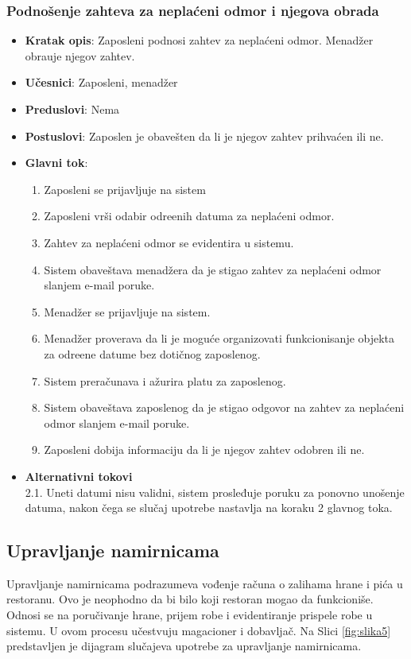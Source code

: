  \subsubsection{Podno\v senje zahteva za nepla\'ceni odmor i njegova obrada }
 \begin{itemize}
    \item \textbf{Kratak opis}:
  Zaposleni podnosi zahtev za nepla\'ceni odmor. Menad\v zer obra\dj uje njegov zahtev.
    \item \textbf{Učesnici}:
    Zaposleni, menad\v zer
    \item \textbf{Preduslovi}: Nema
    \item \textbf{Postuslovi}:
    Zaposlen je obave\v sten da li je njegov zahtev prihva\'cen ili ne.
    \item \textbf{Glavni tok}:
    \begin{enumerate}
        \item Zaposleni se prijavljuje na sistem
        \item Zaposleni vr\v si odabir odre\dj enih datuma za nepla\'ceni odmor.
        \item Zahtev za nepla\'ceni odmor se evidentira u sistemu.
        \item Sistem obave\v stava menad\v zera da je stigao zahtev za nepla\'ceni odmor slanjem e-mail poruke.
        \item Menad\v zer se prijavljuje na sistem.
        \item Menad\v zer proverava da li je moguće organizovati funkcionisanje objekta za odre\dj ene datume bez dotičnog zaposlenog.
        \item Sistem prera\v cunava i a\v zurira platu za zaposlenog.
        \item Sistem obave\v stava zaposlenog da je stigao odgovor na zahtev za nepla\'ceni odmor slanjem e-mail poruke.
        \item Zaposleni dobija informaciju da li je njegov zahtev odobren ili ne.
    \end{enumerate}
\item \textbf{Alternativni tokovi}\\
        2.1. Uneti datumi nisu validni, sistem prosleđuje poruku za ponovno unošenje datuma, nakon čega se slučaj upotrebe nastavlja na koraku 2 glavnog toka.

\end{itemize}
  
 
 \subsection{Upravljanje namirnicama}
 Upravljanje namirnicama podrazumeva vođenje računa o zalihama hrane i pića u restoranu. Ovo je neophodno da bi bilo koji restoran mogao da funkcioniše. Odnosi se na poručivanje hrane, prijem robe i evidentiranje prispele robe u sistemu. U ovom procesu učestvuju magacioner i dobavljač.
 Na Slici \ref{fig:slika5} predstavljen je dijagram slučajeva upotrebe za upravljanje namirnicama.
 
